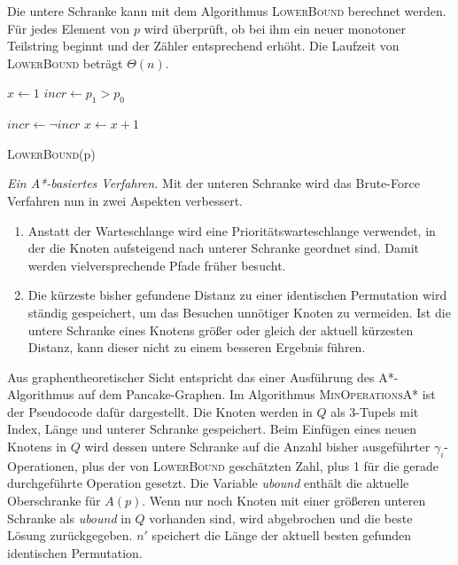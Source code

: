 \documentclass[a4paper, 10pt, ngerman]{article}
\begin{document}
Die untere Schranke kann mit dem Algorithmus \textsc{LowerBound} berechnet werden. Für jedes Element von $p$ wird überprüft, ob bei ihm ein neuer monotoner Teilstring beginnt und der Zähler entsprechend erhöht. Die Laufzeit von \textsc{LowerBound} beträgt $\Theta(n)$.
\bigskip

\begin{algorithm}
    {
         \;
    }

    $x \gets 1$ \;
    $incr \gets p_1 > p_0$ \;

    {
        {
            $incr \gets \neg incr$ \;
            $x \gets x + 1$ \;
        }
    }

     \;

    \caption{\textsc{LowerBound}(p)}
\end{algorithm}

\emph{Ein A*-basiertes Verfahren.} Mit der unteren Schranke wird das Brute-Force Verfahren nun in zwei Aspekten verbessert.

\begin{enumerate}
    \item Anstatt der Warteschlange wird eine Prioritätswarteschlange verwendet, in der die Knoten aufsteigend nach unterer Schranke geordnet sind. Damit werden vielversprechende Pfade früher besucht.
    \item Die kürzeste bisher gefundene Distanz zu einer identischen Permutation wird ständig gespeichert, um das Besuchen unnötiger Knoten zu vermeiden. Ist die untere Schranke eines Knotens größer oder gleich der aktuell kürzesten Distanz, kann dieser nicht zu einem besseren Ergebnis führen.
\end{enumerate}

Aus graphentheoretischer Sicht entspricht das einer Ausführung des A*-Algorithmus auf dem Pancake-Graphen. Im Algorithmus \textsc{MinOperationsA*} ist der Pseudocode dafür dargestellt. Die Knoten werden in $Q$ als 3-Tupels mit Index, Länge und unterer Schranke gespeichert. Beim Einfügen eines neuen Knotens in $Q$ wird dessen untere Schranke auf die Anzahl bisher ausgeführter $\gamma_i$-Operationen, plus der von \textsc{LowerBound} geschätzten Zahl, plus 1 für die gerade durchgeführte Operation gesetzt. Die Variable \emph{ubound} enthält die aktuelle Oberschranke für $A(p)$. Wenn nur noch Knoten mit einer größeren unteren Schranke als \emph{ubound} in $Q$ vorhanden sind, wird abgebrochen und die beste Lösung zurückgegeben. $n'$ speichert die Länge der aktuell besten gefunden identischen Permutation.
\end{document}
